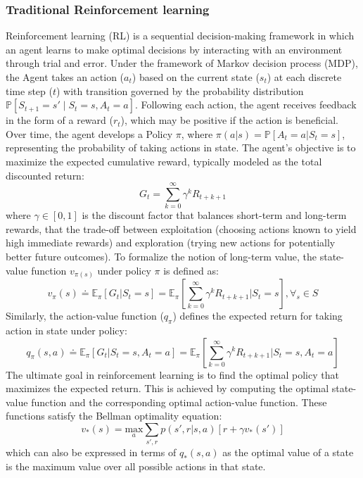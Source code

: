 \documentclass[preprint,12pt]{elsarticle}
\begin{document}
\subsubsection{Traditional Reinforcement learning}
Reinforcement learning (RL) is a sequential decision-making framework in which an agent learns to make optimal decisions by interacting with an environment through trial and error. Under the framework of Markov decision process (MDP), the Agent takes an action ($a_t$) based on the current state ($s_t$) at each discrete time step ($t$) with transition governed by the probability distribution $\mathbb{P}[S_{t+1} = s' \mid S_t = s, A_t = a]$. Following each action, the agent receives feedback in the form of a reward ($r_t$), which may be positive if the action is beneficial. Over time, the agent develops a Policy $\pi$, where $\pi(a|s) = \mathbb{P}[A_t=a|S_t=s]$, representing the probability of taking actions in state. The agent's objective is to maximize the expected cumulative reward, typically modeled as the total discounted return: 
\begin{equation}
    G_t=\sum_{k=0}^{\infty}\gamma^kR_{t+k+1}
\end{equation}
where $\gamma \in [0,1]$ is the discount factor that balances short-term and long-term rewards, that the trade-off between exploitation (choosing actions known to yield high immediate rewards) and exploration (trying new actions for potentially better future outcomes). To formalize the notion of long-term value, the state-value function $v_{\pi(s)}$ under policy $\pi$ is defined as: 
\begin{equation}
    v_\pi(s) \doteq \mathbb{E}_\pi[G_t|S_t=s] = \mathbb{E}_\pi\left[ \sum_{k=0}^{\infty } \gamma^kR_{t+k+1} | S_t=s \right], \forall_s \in S
\end{equation}
Similarly, the action-value function ($q_\pi$) defines the expected return for taking action in state under policy:
\begin{equation}
    q_\pi(s,a) \doteq \mathbb{E}_\pi[G_t|S_t=s, A_t=a] = \mathbb{E}_\pi\left[ \sum_{k=0}^{\infty } \gamma^kR_{t+k+1} | S_t=s, A_t=a \right]
\end{equation}
The ultimate goal in reinforcement learning is to find the optimal policy that maximizes the expected return. This is achieved by computing the optimal state-value function and the corresponding optimal action-value function. These functions satisfy the Bellman optimality equation:
\begin{equation}
    v_*(s) = \underset{a}{\mathrm{max}}\sum_{s',r}p(s',r|s,a)[r+\gamma v_*(s')]
\end{equation}
which can also be expressed in terms of $q_*(s,a)$ as the optimal value of a state is the maximum value over all possible actions in that state. 
\end{document}
